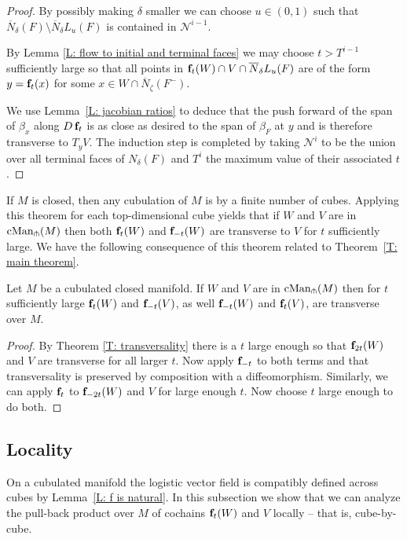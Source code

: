 \begin{proof}
	By possibly making $\delta$ smaller we can choose $u \in (0, 1)$ such that $\overline N_\delta(F) \setminus \overline N_\delta L_u(F)$ is contained in $\mathcal N^{i-1}$.

	By Lemma \ref{L: flow to initial and terminal faces} we may choose $t > T^{i-1}$ sufficiently large so that all points in $\mathbf{f}_t(W) \cap V \cap \overline N_\delta L_u(F)$ are of the form $y = \mathbf{f}_t(x)$ for some $x \in W \cap \overline N_\zeta(F^-)$.

	We use Lemma~\ref{L: jacobian ratios} to deduce that the push forward of the span of $\beta_x$ along $D\,\mathbf{f}_t$ is as close as desired to the span of $\beta_F$ at $y$ and is therefore transverse to $T_y V$.
	The induction step is completed by taking $\mathcal N^i$ to be the union over all terminal faces of $N_\delta(F)$ and $T^i$ the maximum value of their associated $t$.
\end{proof}

If $M$ is closed, then any cubulation of $M$ is by a finite number of cubes.
Applying this theorem for each top-dimensional cube yields that if $W$ and $V$ are in $\mathrm{cMan}_\pitchfork(M)$ then both $\mathbf{f}_t(W)$ and $\mathbf{f}_{-t}(W)$ are transverse to $V$ for $t$ sufficiently large.
We have the following consequence of this theorem related to Theorem~\ref{T: main theorem}.

\begin{corollary}\label{C: transversality}
	Let $M$ be a cubulated closed manifold.
	If $W$ and $V$ are in $\mathrm{cMan}_\pitchfork(M)$ then for $t$ sufficiently large $\mathbf{f}_t(W)$ and $\mathbf{f}_{-t}(V)$, as well $\mathbf{f}_{-t}(W)$ and $\mathbf{f}_t(V)$, are transverse over $M$.
\end{corollary}

\begin{proof}
	By Theorem \ref{T: transversality} there is a $t$ large enough so that $\mathbf{f}_{2t}(W)$ and $V$ are transverse for all larger $t$. Now apply $\mathbf{f}_{-t}$ to both terms and that transversality is preserved by composition with a diffeomorphism. Similarly, we can apply $\mathbf{f}_t$ to $\mathbf{f}_{-2t}(W)$ and $V$ for large enough $t$.
	Now choose $t$ large enough to do both.
\end{proof}

\subsection{Locality}

On a cubulated manifold the logistic vector field is compatibly defined across cubes by Lemma~\ref{L: f is natural}.
In this subsection we show that we can analyze the pull-back product over $M$ of cochains $\mathbf{f}_t(W)$ and $V$ locally -- that is, cube-by-cube.

